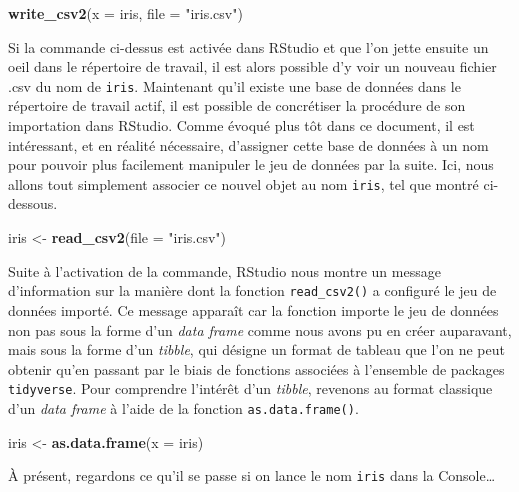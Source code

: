 \documentclass[
  french,
]{book}
\newenvironment{Shaded}{\begin{snugshade}}{\end{snugshade}}
\newcommand{\DataTypeTok}[1]{\textcolor[rgb]{0.13,0.29,0.53}{#1}}
\newcommand{\KeywordTok}[1]{\textcolor[rgb]{0.13,0.29,0.53}{\textbf{#1}}}
\newcommand{\NormalTok}[1]{#1}
\newcommand{\StringTok}[1]{\textcolor[rgb]{0.31,0.60,0.02}{#1}}
\begin{document}
\begin{Shaded}
\begin{Highlighting}[]
\KeywordTok{write_csv2}\NormalTok{(}\DataTypeTok{x =}\NormalTok{ iris, }\DataTypeTok{file =} \StringTok{"iris.csv"}\NormalTok{)}
\end{Highlighting}
\end{Shaded}

Si la commande ci-dessus est activée dans RStudio et que l'on jette ensuite un oeil dans le répertoire de travail, il est alors possible d'y voir un nouveau fichier .csv du nom de \texttt{iris}. Maintenant qu'il existe une base de données dans le répertoire de travail actif, il est possible de concrétiser la procédure de son importation dans RStudio. Comme évoqué plus tôt dans ce document, il est intéressant, et en réalité nécessaire, d'assigner cette base de données à un nom pour pouvoir plus facilement manipuler le jeu de données par la suite. Ici, nous allons tout simplement associer ce nouvel objet au nom \texttt{iris}, tel que montré ci-dessous.

\begin{Shaded}
\begin{Highlighting}[]
\NormalTok{iris <-}\StringTok{ }\KeywordTok{read_csv2}\NormalTok{(}\DataTypeTok{file =} \StringTok{"iris.csv"}\NormalTok{)}
\end{Highlighting}
\end{Shaded}

Suite à l'activation de la commande, RStudio nous montre un message d'information sur la manière dont la fonction \texttt{read\_csv2()} a configuré le jeu de données importé. Ce message apparaît car la fonction importe le jeu de données non pas sous la forme d'un \emph{data frame} comme nous avons pu en créer auparavant, mais sous la forme d'un \emph{tibble}, qui désigne un format de tableau que l'on ne peut obtenir qu'en passant par le biais de fonctions associées à l'ensemble de packages \texttt{tidyverse}. Pour comprendre l'intérêt d'un \emph{tibble}, revenons au format classique d'un \emph{data frame} à l'aide de la fonction \texttt{as.data.frame()}.

\begin{Shaded}
\begin{Highlighting}[]
\NormalTok{iris <-}\StringTok{ }\KeywordTok{as.data.frame}\NormalTok{(}\DataTypeTok{x =}\NormalTok{ iris)}
\end{Highlighting}
\end{Shaded}

À présent, regardons ce qu'il se passe si on lance le nom \texttt{iris} dans la Console\ldots{}
\end{document}
